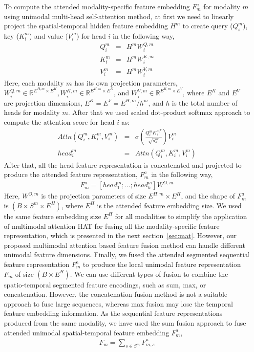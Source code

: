 \documentclass[runningheads]{llncs}
\newcommand{\hattn}{HAT}
\begin{document}
To compute the attended modality-specific feature embedding $F^{a}_{m}$ for modality $m$ using unimodal multi-head self-attention method, at first we need to linearly project the spatial-temporal hidden feature embedding $H^m$ to create query ($Q^m_i$), key ($K^m_i$) and value ($V^m_i$) for head $i$ in the following way,
\begin{eqnarray}
    Q_i^m &=& H^m W_i^{Q,m}\\
    K_i^m &=& H^m W_i^{K,m}\\
    V_i^m &=& H^m W_i^{V,m}
\end{eqnarray}
Here, each modality $m$ has its own projection parameters, $W_i^{Q,m} \in \mathbb{R}^{E^{H,m}\times E^K}, W_i^{K,m} \in \mathbb{R}^{E^{H,m}\times E^K}$, and $W_i^{V,m} \in \mathbb{R}^{E^{H,m}\times E^V}$, where $E^K$ and $E^V$ are projection dimensions, $E^K=E^V=E^{H,m}/h^m$, and $h$ is the total number of heads for modality $m$. After that we used scaled dot-product softmax approach to compute the attention score for head $i$ as:
\begin{eqnarray}
    Attn(Q_i^m, K_i^m, V_i^m) &=& \sigma \left( \frac{Q_i^m K_i^{m^T}}{\sqrt{d_k^m}} \right)V_i^m\\
    head_i^m &=& Attn(Q_i^m, K_i^m, V_i^m)
\end{eqnarray}
After that, all the head feature representation is concatenated and projected to produce the attended feature representation, $F^{a}_{m}$ in the following way, 
\begin{eqnarray}
    F^{a}_{m} = [head_1^m;...;head_h^m]W^{O,m}
\end{eqnarray}
Here, $W^{O,m}$ is the projection parameters of size $E^{H,m} \times E^{H}$, and the shape of $F^{a}_{m}$ is $(B\times S^m \times E^H)$, where $E^H$ is the attended feature embedding size. We used the same feature embedding size $E^H$ for all modalities to simplify the application of multimodal attention {\hattn } for fusing all the modality-specific feature representation, which is presented in the next section~\ref{sec:mat}. However, our proposed multimodal attention based feature fusion method can handle different unimodal feature dimensions. Finally, we fused the attended segmented sequential feature representation $F^{a}_{m}$ to produce the local unimodal feature representation $F_{m}$ of size $(B \times E^H)$. We can use different types of fusion to combine the spatio-temporal segmented feature encodings, such as sum, max, or concatenation. However, the concatenation fusion method is not a suitable approach to fuse large sequences, whereas max fusion may lose the temporal feature embedding information. As the sequential feature representations produced from the same modality, we have used the sum fusion approach to fuse attended unimodal spatial-temporal feature embedding $F^{a}_{m}$,
\begin{eqnarray}
    F_{m} = \sum_{s \in S^m} F^{a}_{m,s}
\end{eqnarray}
\end{document}
